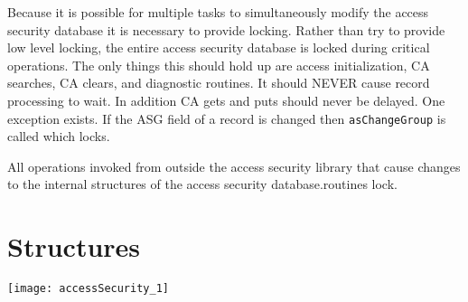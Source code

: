 Because it is possible for multiple tasks to simultaneously modify the access security database it is necessary to provide 
locking. Rather than try to provide low level locking, the entire access security database is locked during critical 
operations. The only things this should hold up are access initialization, CA searches, CA clears, and diagnostic routines. 
It should NEVER cause record processing to wait. In addition CA gets and puts should never be delayed. One exception 
exists. If the ASG field of a record is changed then \verb|asChangeGroup| is called which locks.

All operations invoked from outside the access security library that cause changes to the internal structures of the access 
security database.routines lock.

\section{Structures}

\texttt{[image: accessSecurity\_1]}










